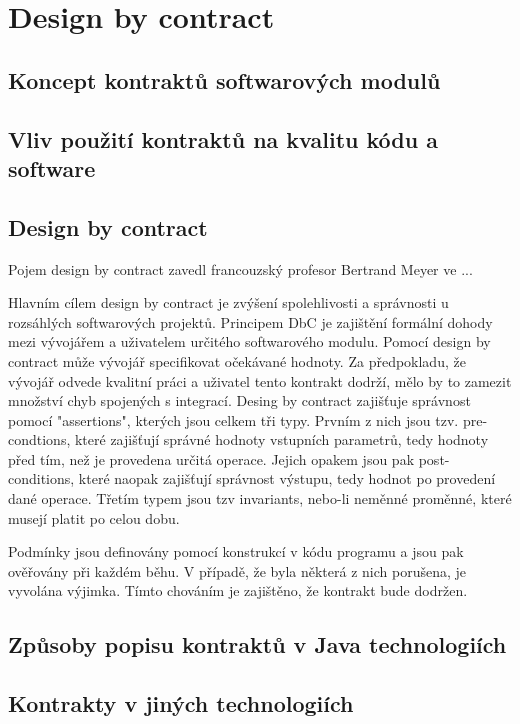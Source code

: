 \chapter{Design by contract}

	\section{Koncept kontraktů softwarových modulů}
	
	\section{Vliv použití kontraktů na kvalitu kódu a software} 
	
	\section{Design by contract}
	Pojem design by contract zavedl francouzský profesor Bertrand Meyer ve ... \cite{meyerBio}
	
	
	
	Hlavním cílem design by contract je zvýšení spolehlivosti a správnosti u rozsáhlých softwarových projektů. Principem DbC je zajištění formální dohody mezi vývojářem a uživatelem určitého softwarového modulu. Pomocí design by contract může vývojář specifikovat očekávané hodnoty. Za předpokladu, že vývojář odvede kvalitní práci a uživatel tento kontrakt dodrží, mělo by to zamezit množství chyb spojených s integrací. Desing by contract zajišťuje správnost pomocí "assertions", kterých jsou celkem tři typy. Prvním z nich jsou tzv. pre-condtions, které zajišťují správné hodnoty vstupních parametrů, tedy hodnoty před tím, než je provedena určitá operace. Jejich opakem jsou pak post-conditions, které naopak zajišťují správnost výstupu, tedy hodnot po provedení dané operace. Třetím typem jsou tzv invariants, nebo-li neměnné proměnné, které musejí platit po celou dobu.
	
	Podmínky jsou definovány pomocí konstrukcí v kódu programu a jsou pak ověřovány při každém běhu. V případě, že byla některá z nich porušena, je vyvolána výjimka. Tímto chováním je zajištěno, že kontrakt bude dodržen.
	\cite{DesignByContractComponentware}
	
	\section{Způsoby popisu kontraktů v Java technologiích} 
	
	\section{Kontrakty v jiných technologiích}